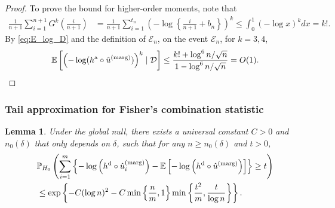 \documentclass[11pt]{article}
\newtheorem{lemma}{Lemma}
\def\E{\mathbb{E}}
\def\marg{\textnormal{(marg)}}
\def\dkwm{\textnormal{d}}
\def\asym{\textnormal{a}}
\renewcommand{\P}{\mathbb{P}}
\newcommand{\D}{\mathcal{D}}
\newcommand{\event}{\mathcal{E}}
\newcommand{\lb}{\left(}
\newcommand{\rb}{\right)}
\begin{document}
\begin{proof}
  To prove the bound for higher-order moments, note that
  \begin{align*}
    \frac{1}{n+1}\sum_{i=1}^{n+1}G^k\left(\frac{i}{n+1}\right) &= \frac{1}{n+1}\sum_{i=1}^{t_n} \lb -\log \left\{\frac{i}{n+1} + b_n\right\}\rb^{k} \le \int_{0}^{1}(-\log x)^k dx = k!.
  \end{align*}
  By \eqref{eq:E_log_D} and the definition of $\event_{n}$, on the event $\event_{n}$, for $k = 3,4$,
  \[\E\left[\lb -\log (h^\asym \circ \hat{u}^\marg)\rb^{k}\mid \D\right]\le \frac{k! + \log^6 n / \sqrt{n}}{1 - \log^6 n / \sqrt{n}} = O(1).\]
\end{proof}

\subsubsection{Tail approximation for Fisher's combination statistic}
\begin{lemma}\label{lem:fisher_dkwm_tail}
  Under the global null, there exists a universal constant $C > 0$ and $n_0(\delta)$ that only depends on $\delta$, such that for any $n\ge n_0(\delta)$ and $t > 0$,
  \begin{align*}
    &\P_{H_0}\lb \sum_{i=1}^{m}\left\{-\log\lb h^{\dkwm} \circ \hat{u}^\marg_i\rb - \E\left[-\log\lb h^{\dkwm} \circ \hat{u}^\marg\rb\right]\right\}\ge t\rb\\
    & \le \exp\left\{-C(\log n)^2 - C\min\left\{\frac{n}{m}, 1\right\}\min\left\{\frac{t^2}{m}, \frac{t}{\log n}\right\}\right\}.
  \end{align*}
\end{lemma}
\end{document}
